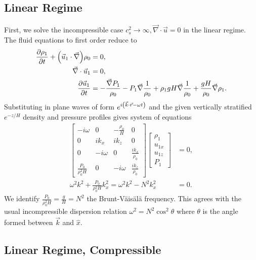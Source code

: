 \documentclass[11pt,
        usenames, %
        dvipsnames %
    ]{report}
\newcommand*{\pd}[2]{\frac{\partial#1}{\partial#2}}
\DeclarePairedDelimiter\p{\lparen}{\rparen}
\begin{document}
\subsection{Linear Regime}

First, we solve the incompressible case $c_s^2 \to \infty, \vec{\nabla} \cdot
\vec{u} = 0$ in the linear regime. The fluid equations to first order reduce to
\begin{equation}
    \begin{split}
        \pd{\rho_1}{t} + \p*{\vec{u}_1 \cdot \vec{\nabla}}\rho_0 &= 0,\\
        \vec{\nabla} \cdot \vec{u}_1 &= 0,\\
        \pd{\vec{u}_1}{t} &= -\frac{\vec{\nabla}P_1}{\rho_0}
            - P_1 \vec{\nabla}\frac{1}{\rho_0}
            + \rho_1 gH \vec{\nabla}\frac{1}{\rho_0}
            + \frac{gH}{\rho_0} \vec{\nabla}\rho_1.
    \end{split}\label{eq:lin_incomp}
\end{equation}
Substituting in plane waves of form $e^{i\p*{\vec{k} \cdot \vec{r} - \omega t}}$
and the given vertically stratified $e^{-z/H}$ density and pressure profiles
gives system of equations
\begin{align}
    \begin{bmatrix}
        -i\omega & 0 & -\frac{\rho_0}{H} & 0\\
        0 & ik_x & ik_z & 0\\
        0 & -i\omega & 0 & \frac{ik_x}{\rho_0}\\
        \frac{P_0}{\rho_0^2H} & 0 & -i\omega & \frac{ik_z}{\rho_0}
    \end{bmatrix}\begin{bmatrix}
        \rho_1 \\ u_{1x} \\ u_{1z} \\ P_1
    \end{bmatrix} &= 0,\nonumber\\
    \omega^2 k^2 + \frac{P_0}{\rho_0^2H}k_x^2 = \omega^2k^2 - N^2k_x^2 &= 0.
\end{align}
We identify $\frac{P_0}{\rho_0^2H} = \frac{g}{H} = N^2$ the Brunt-V\"ais\"al\"a
frequency. This agrees with the usual incompressible dispersion relation
$\omega^2 = N^2\cos^2\theta$ where $\theta$ is the angle formed between
$\vec{k}$ and $\hat{x}$.

\subsection{Linear Regime, Compressible}
\end{document}
